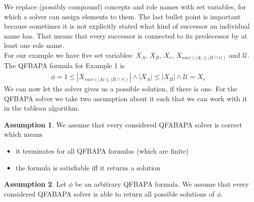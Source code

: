 \documentclass{book}
\theoremstyle{break}
\theoremstyle{definition}
\newtheorem{assumption}{Assumption}
\begin{document}
We replace (possibly compound) concepts and role names with set variables, for which a solver can assign elements to them. The last bullet point is important because sometimes it is not explicitly stated what kind of successor an individual name has. That means that every successor is connected to its predecessor by at least one role name.\\
For our example we have five set variables: $X_A$, $X_B$, $X_r$, $X_{succ(|A|\leq |B\cap r|)}$ and $\mathcal{U}$. The QFBAPA formula for Example 1 is 
\begin{align}\label{f}
\phi=1\leq |X_{succ(|A|\leq |B\cap r|)}|\wedge |X_A|\leq |X_B|\wedge \mathcal{U}=X_r
\end{align}
We can now let the solver gives us a possible solution, if there is one. For the QFBAPA solver we take two assumption about it such that we can work with it in the tableau algorithm.
\begin{assumption}\label{assumption1}
We assume that every considered QFABAPA solver is correct which means
\begin{itemize}
\item it terminates for all QFBAPA formulas (which are finite)
\item the formula is satisfiable iff it returns a solution
\end{itemize}
\end{assumption}
\begin{assumption}\label{assumption2}
Let $\phi$ be an arbitrary QFBAPA formula. We assume that every considered QFABAPA solver is able to return all possible solutions of $\phi$.
\end{assumption}
\end{document}
